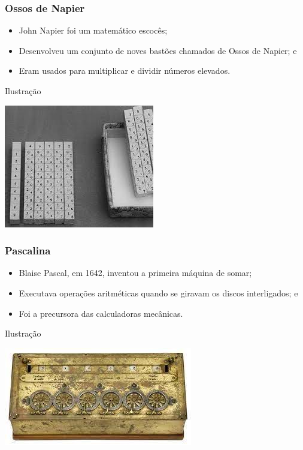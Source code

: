\documentclass[aspectratio=169]{beamer} %
\begin{document}
\begin{frame}
	\frametitle{Ossos de Napier}
	
	\begin{itemize}
		\item John Napier foi um matemático escocês;
		\item Desenvolveu um conjunto de noves bastões chamados de Ossos de Napier; e
		\item Eram usados para multiplicar e dividir números elevados.
	\end{itemize}\vfill
	
	\begin{exampleblock}{Ilustra\c cão}
		\begin{center}
			\includegraphics[scale=0.5]{img/ossos_napier}
		\end{center}
	\end{exampleblock}
\end{frame}

\begin{frame}
	\frametitle{Pascalina}
	
	\begin{itemize}
		\item Blaise Pascal, em 1642, inventou a primeira máquina de somar;
		\item Executava operações aritméticas quando se giravam os discos interligados; e
		\item Foi a precursora das calculadoras mecânicas.
	\end{itemize}\vfill
	
	\begin{exampleblock}{Ilustra\c cão}
		\begin{center}
			\includegraphics[scale=0.5]{img/pascalina}
		\end{center}
	\end{exampleblock}
\end{frame}
\end{document}
